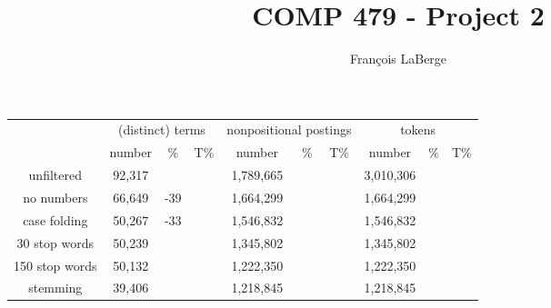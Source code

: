 \documentclass[]{report}
\title{COMP 479 - Project 2}
\author{François LaBerge}
\begin{document}
\maketitle

\begin{center}
\begin{tabular}{ |c|c c c c c c c c c| } 
	\hline
	& \multicolumn{3}{|c}{(distinct) terms} & \multicolumn{3}{c}{nonpositional postings} & \multicolumn{3}{c|}{tokens}\\
	& number & \Delta\% & T\% & number & \Delta\% & T\% & number & \Delta\% & T\% \\
	\hline
	unfiltered		& 92,317 & & & 1,789,665 & & & 3,010,306 & &\\
	no numbers		& 66,649 & -39 & & 1,664,299 & & & 1,664,299 & &\\
	case folding	& 50,267 & -33 & & 1,546,832 & & & 1,546,832 & &\\
	30 stop words	& 50,239 & & & 1,345,802 & & & 1,345,802& &\\
	150 stop words	& 50,132 & & & 1,222,350 & & & 1,222,350& &\\
	stemming		& 39,406 & & & 1,218,845 & & & 1,218,845& &\\
	\hline
\end{tabular}
\end{center}
\end{document}

